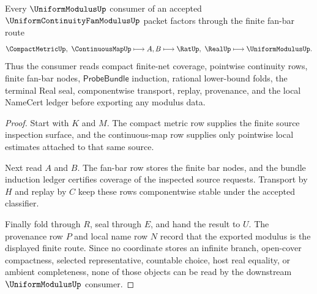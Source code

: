 \begin{theorem}
\label{thm:uniform-continuity-fan-modulus-fanbar-route}
Every $\UniformModulusUp$ consumer of an accepted $\UniformContinuityFanModulusUp$ packet factors through the finite fan-bar route
$$
\CompactMetricUp,\ \ContinuousMapUp
\longmapsto
A,B
\longmapsto
\RatUp,\ \RealUp
\longmapsto
\UniformModulusUp .
$$
Thus the consumer reads compact finite-net coverage, pointwise continuity rows, finite fan-bar nodes, $\mathsf{ProbeBundle}$ induction, rational lower-bound folds, the terminal Real seal, componentwise transport, replay, provenance, and the local NameCert ledger before exporting any modulus data.
\end{theorem}
\begin{proof}
Start with $K$ and $M$. The compact metric row supplies the finite source inspection surface, and the continuous-map row supplies only pointwise local estimates attached to that same source.

Next read $A$ and $B$. The fan-bar row stores the finite bar nodes, and the bundle induction ledger certifies coverage of the inspected source requests. Transport by $H$ and replay by $C$ keep these rows componentwise stable under the accepted classifier.

Finally fold through $R$, seal through $E$, and hand the result to $U$. The provenance row $P$ and local name row $N$ record that the exported modulus is the displayed finite route. Since no coordinate stores an infinite branch, open-cover compactness, selected representative, countable choice, host real equality, or ambient completeness, none of those objects can be read by the downstream $\UniformModulusUp$ consumer.
\end{proof}


